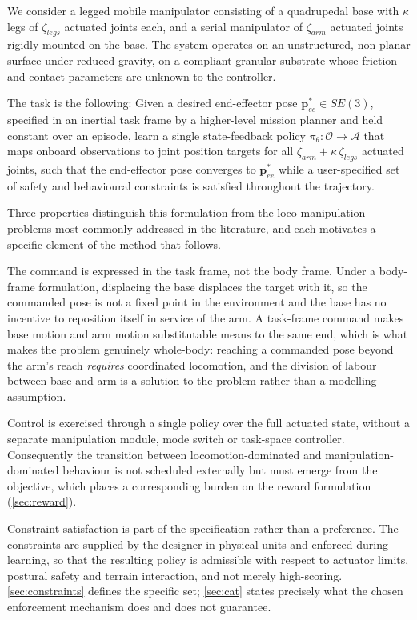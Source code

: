 We consider a legged mobile manipulator consisting of a quadrupedal base with $\kappa$ legs of $\zeta_{legs}$ actuated joints each, and a serial manipulator of $\zeta_{arm}$ actuated joints rigidly mounted on the base. The system operates on an unstructured, non-planar surface under reduced gravity, on a compliant granular substrate whose friction and contact parameters are unknown to the controller.

The task is the following: Given a desired end-effector pose $\boldsymbol{p}^{*}_{ee} \in SE(3)$, specified in an inertial task frame by a higher-level mission planner and held constant over an episode, learn a single state-feedback policy $\pi_\theta: \mathcal{O} \rightarrow \mathcal{A}$ that maps onboard observations to joint position targets for all $\zeta_{arm} + \kappa\,\zeta_{legs}$ actuated joints, such that the end-effector pose converges to $\boldsymbol{p}^{*}_{ee}$ while a user-specified set of safety and behavioural constraints is satisfied throughout the trajectory.

Three properties distinguish this formulation from the loco-manipulation problems most commonly addressed in the literature, and each motivates a specific element of the method that follows.

The command is expressed in the task frame, not the body frame. Under a body-frame formulation, displacing the base displaces the target with it, so the commanded pose is not a fixed point in the environment and the base has no incentive to reposition itself in service of the arm. A task-frame command makes base motion and arm motion substitutable means to the same end, which is what makes the problem genuinely whole-body: reaching a commanded pose beyond the arm's reach \emph{requires} coordinated locomotion, and the division of labour between base and arm is a solution to the problem rather than a modelling assumption.

Control is exercised through a single policy over the full actuated state, without a separate manipulation module, mode switch or task-space controller. Consequently the transition between locomotion-dominated and manipulation-dominated behaviour is not scheduled externally but must emerge from the objective, which places a corresponding burden on the reward formulation (\cref{sec:reward}).

Constraint satisfaction is part of the specification rather than a preference. The constraints are supplied by the designer in physical units and enforced during learning, so that the resulting policy is admissible with respect to actuator limits, postural safety and terrain interaction, and not merely high-scoring. \cref{sec:constraints} defines the specific set; \cref{sec:cat} states precisely what the chosen enforcement mechanism does and does not guarantee.

